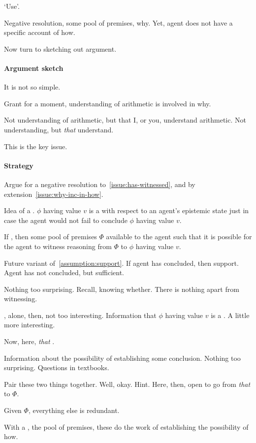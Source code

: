 \begin{note}
  `Use'.

  Negative resolution, some pool of premises, why.
  Yet, agent does not have a specific account of how.
\end{note}

\begin{note}
  Now turn to sketching out argument.
\end{note}

\paragraph*{Argument sketch}

\begin{note}[Subtlety]
  It is not so simple.

  Grant for a moment, understanding of arithmetic is involved in why.

  Not understanding of arithmetic, but that I, or you, understand arithmetic.
  Not understanding, but \emph{that} understand.

  This is the key issue.
\end{note}

\paragraph*{Strategy}

\begin{note}[Outline]
  Argue for a negative resolution to~\autoref{issue:has-witnessed}, and by extension~\autoref{issue:why-inc-in-how}.

  Idea of a .
  \(\phi\) having value \(v\) is a  with respect to an agent's epistemic state just in case the agent would not fail to conclude \(\phi\) having value \(v\).

  If , then some pool of premises \(\Phi\) available to the agent such that it is possible for the agent to witness reasoning from \(\Phi\) to \(\phi\) having value \(v\).

  Future variant of~\autoref{assumption:support}.
  If agent has concluded, then support.
  Agent has not concluded, but sufficient.

  Nothing too surprising.
  Recall, knowing whether.
  There is nothing apart from witnessing.

  , alone, then, not too interesting.
  Information that \(\phi\) having value \(v\) is a .
  A little more interesting.

  Now, here, \emph{that} .

  Information about the possibility of establishing some conclusion.
  Nothing too surprising.
  Questions in textbooks.

  Pair these two things together.
  Well, okay.
  Hint.
  Here, then, open to go from \emph{that}  to \(\Phi\).

  Given \(\Phi\), everything else is redundant.

  With a , the pool of premises, these do the work of establishing the possibility of how.

\end{note}


